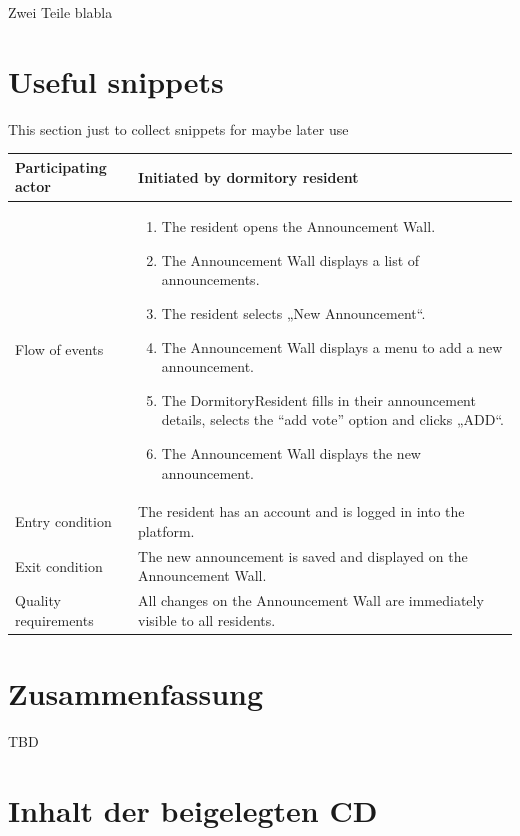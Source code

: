 \documentclass[11pt,a4paper,twoside,ngerman]{article}
\begin{document}
Zwei Teile blabla

\clearpage
\section*{Useful snippets}
This section just to collect snippets for maybe later use

\begin{center}
	\begin{tabular}{ m{10em} m{10cm} } 
		Participating actor  & Initiated by dormitory resident\\ 
		\hline
		Flow of events &
		\begin{enumerate}
			\item The resident opens the Announcement Wall.
			\item The Announcement Wall displays a list of announcements.
			\item The resident selects „New Announcement“.
			\item The Announcement Wall displays a menu to add a new announcement.
			\item The DormitoryResident fills in their announcement details, selects the “add vote” option and clicks „ADD“.
			\item The Announcement Wall displays the new announcement.
		\end{enumerate}	
		\\ 
		\hline
		Entry condition & The resident has an account and is logged in into the platform.\\ 
		\hline
		Exit condition & The new announcement is saved and displayed on the Announcement Wall. \\ 
		\hline
		Quality requirements & All changes on the Announcement Wall are immediately visible to all residents.
	\end{tabular}
\end{center}


\cleardoublepage
\section{Zusammenfassung}
TBD

\cleardoublepage
\fancyhead[LE,RO,LO,RE]{} %
\section*{Inhalt der beigelegten CD}

\cleardoublepage


\end{document}
